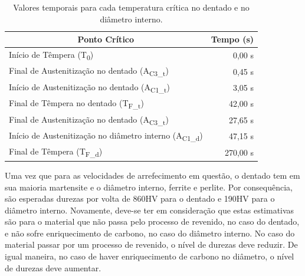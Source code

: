 \begin{table}[htb]
    \centering
    \caption[Valores temporais para cada temperatura crítica]{Valores temporais para cada temperatura crítica no dentado e no diâmetro interno.}
    \label{tab:pontos_sim}
    \begin{tabular}{lr} 
    \toprule
    \multicolumn{1}{c}{\textbf{Ponto Crítico}}            & \multicolumn{1}{c}{\textbf{Tempo (s)}}                         \\ 
    \hline\hline
    Início de Têmpera (T\textsubscript{0})                                & 0,00 s                                         \\ 
    \hline
    Final de Austenitização no dentado (A\textsubscript{C3\_t})           & 0,45 s                                         \\
    Início de Austenitização no dentado (A\textsubscript{C1\_t})          & 3,05 s                                         \\
    Final de Têmpera no dentado (T\textsubscript{F\_t})                   & 42,00 s                                        \\ 
    \hline\hline
    Final de Austenitização no dentado (A\textsubscript{C3\_t})           & 27,65 s                                        \\
    Início de Austenitização no diâmetro interno (A\textsubscript{C1\_d}) & 47,15 s                                        \\ 
    Final de Têmpera (T\textsubscript{F\_d})                              & 270,00 s                                       \\
    \bottomrule
    \end{tabular}
\end{table}
\par
Uma vez que para as velocidades de arrefecimento em questão, o dentado tem em sua maioria martensite e o diâmetro interno, ferrite e perlite. Por consequência, são esperadas durezas por volta de 860HV para o dentado e 190HV para o diâmetro interno. Novamente, deve-se ter em consideração que estas estimativas são para o material que não passa pelo processo de revenido, no caso do dentado, e não sofre enriquecimento de carbono, no caso do diâmetro interno. No caso do material passar por um processo de revenido, o nível de durezas deve reduzir. De igual maneira, no caso de haver enriquecimento de carbono no diâmetro, o nível de durezas deve aumentar.
